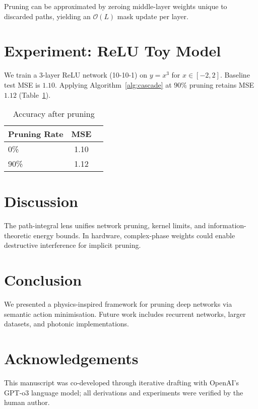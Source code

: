 \documentclass[11pt]{article}
\begin{document}
Pruning can be approximated by zeroing middle-layer weights unique to discarded paths, yielding an $\mathcal{O}(L)$ mask update per layer.

\section{Experiment: ReLU Toy Model}
We train a 3-layer ReLU network (10-10-1) on $y=x^3$ for $x\in[-2,2]$.  Baseline test MSE is $1.10$.  Applying Algorithm~\ref{alg:cascade} at $90\%$ pruning retains MSE $1.12$ (Table~\ref{tab:mse}).

\begin{table}[h]
  \centering
  \begin{tabular}{@{}lcc@{}}
    \toprule
    Pruning Rate & MSE \\
    \midrule
    0\%  & 1.10 \\
    90\% & 1.12 \\
    \bottomrule
  \end{tabular}
  \caption{Accuracy after pruning}
  \label{tab:mse}
\end{table}

\section{Discussion}
The path-integral lens unifies network pruning, kernel limits, and information-theoretic energy bounds.  In hardware, complex-phase weights could enable destructive interference for implicit pruning.

\section{Conclusion}
We presented a physics-inspired framework for pruning deep networks via semantic action minimisation.  Future work includes recurrent networks, larger datasets, and photonic implementations.

\section*{Acknowledgements}
This manuscript was co-developed through iterative drafting with OpenAI’s GPT-o3 language model; all derivations and experiments were verified by the human author.



\end{document}
